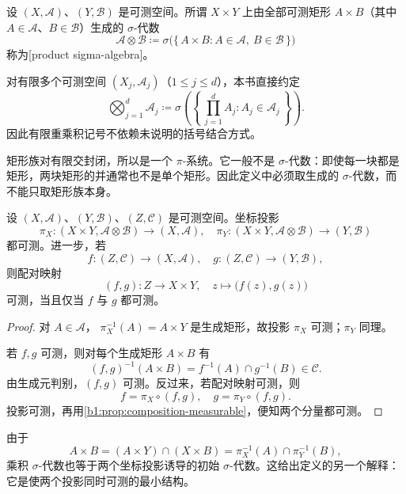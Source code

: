 \begin{definition}
\label{b1:def:product-sigma}
设 \((X,\mathcal A)\)、\((Y,\mathcal B)\) 是可测空间。所谓 \(X\times Y\) 上由全部可测矩形 \(A\times B\)（其中 \(A\in\mathcal A\)、\(B\in\mathcal B\)）生成的 \(\sigma\)-代数
\[
\mathcal A\otimes\mathcal B
\coloneqq\sigma\bigl(\{\,A\times B:A\in\mathcal A,\ B\in\mathcal B\,\}\bigr)
\]
称为[product sigma-algebra]。

\ProseParagraphBreak

对有限多个可测空间 \((X_j,\mathcal A_j)\)（\(1\leq j\leq d\)），本书直接约定
\[
\bigotimes_{j=1}^{d}\mathcal A_j
\coloneqq\sigma\left(\left\{\,\prod_{j=1}^{d}A_j:A_j\in\mathcal A_j\,\right\}\right).
\]
因此有限重乘积记号不依赖未说明的括号结合方式。
\end{definition}

矩形族对有限交封闭，所以是一个 \(\pi\)-系统。它一般不是 \(\sigma\)-代数：即使每一块都是矩形，两块矩形的并通常也不是单个矩形。因此定义中必须取生成的 \(\sigma\)-代数，而不能只取矩形族本身。

\begin{proposition}
\label{b1:prop:pair-measurable}
设 \((X,\mathcal A)\)、\((Y,\mathcal B)\)、\((Z,\mathcal C)\) 是可测空间。坐标投影
\[
\pi_X:(X\times Y,\mathcal A\otimes\mathcal B)
\longrightarrow(X,\mathcal A),
\quad
\pi_Y:(X\times Y,\mathcal A\otimes\mathcal B)
\longrightarrow(Y,\mathcal B)
\]
都可测。进一步，若
\[
f:(Z,\mathcal C)\longrightarrow(X,\mathcal A),
\quad
g:(Z,\mathcal C)\longrightarrow(Y,\mathcal B),
\]
则配对映射
\[
(f,g):Z\longrightarrow X\times Y,
\quad
z\longmapsto\bigl(f(z),g(z)\bigr)
\]
可测，当且仅当 \(f\) 与 \(g\) 都可测。
\end{proposition}
\begin{proof}
对 \(A\in\mathcal A\)，
\(
\pi_X^{-1}(A)=A\times Y
\)
是生成矩形，故投影 \(\pi_X\) 可测；\(\pi_Y\) 同理。

若 \(f,g\) 可测，则对每个生成矩形 \(A\times B\) 有
\[
(f,g)^{-1}(A\times B)
=f^{-1}(A)\cap g^{-1}(B)
\in\mathcal C.
\]
由生成元判别，\((f,g)\) 可测。反过来，若配对映射可测，则
\[
f=\pi_X\circ(f,g),
\quad
g=\pi_Y\circ(f,g).
\]
投影可测，再用\cref{b1:prop:composition-measurable}，便知两个分量都可测。
\end{proof}

由于
\[
A\times B
=(A\times Y)\cap(X\times B)
=\pi_X^{-1}(A)\cap\pi_Y^{-1}(B),
\]
乘积 \(\sigma\)-代数也等于两个坐标投影诱导的初始 \(\sigma\)-代数。这给出定义的另一个解释：它是使两个投影同时可测的最小结构。

